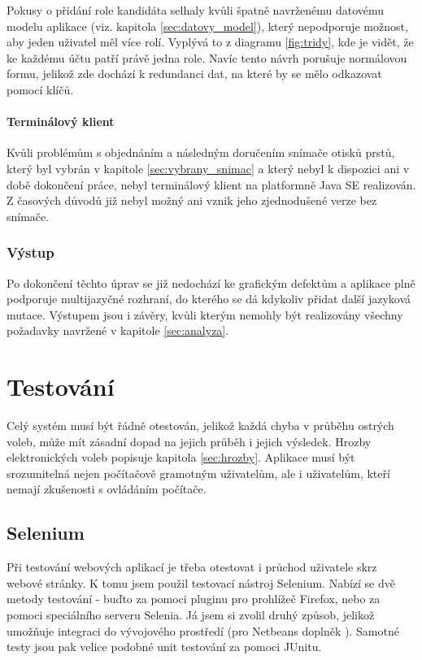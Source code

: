 \documentclass[11pt,twoside,a4paper]{book}
\begin{document}
Pokusy o přidání role kandidáta selhaly kvůli špatně navrženému datovému modelu aplikace (viz. kapitola \ref{sec:datovy_model}), který nepodporuje možnost, aby jeden uživatel měl více rolí. Vyplývá to z diagramu \ref{fig:tridy}, kde je vidět, že ke každému účtu patří právě jedna role. Navíc tento návrh porušuje normálovou formu, jelikož zde dochází k redundanci dat, na které by se mělo odkazovat pomocí klíčů.

\subsubsection{Terminálový klient}

Kvůli problémům s objednáním a následným doručením snímače otisků prstů, který byl vybrán v kapitole \ref{sec:vybrany_snimac} a který nebyl k dispozici ani v době dokončení práce, nebyl terminálový klient na platformně Java SE realizován. Z časových důvodů již nebyl možný ani vznik jeho zjednodušené verze bez snímače.

\subsection{Výstup}

Po dokončení těchto úprav se již nedochází ke grafickým defektům a aplikace plně podporuje multijazyčné rozhraní, do kterého se dá kdykoliv přidat další jazyková mutace. Výstupem jsou i závěry, kvůli kterým nemohly být realizovány všechny požadavky navržené v kapitole \ref{sec:analyza}.


\chapter{Testování}

Celý systém musí být řádně otestován, jelikož každá chyba v průběhu ostrých voleb, může mít zásadní dopad na jejich průběh i jejich výsledek. Hrozby elektronických voleb popisuje kapitola \ref{sec:hrozby}. Aplikace musí být srozumitelná nejen počítačově gramotným uživatelům, ale i uživatelům, kteří nemají zkušenosti s ovládáním počítače. 


\section{Selenium}

Při testování webových aplikací je třeba otestovat i průchod uživatele skrz webové stránky. K tomu jsem použil testovací nástroj Selenium. Nabízí se dvě metody testování - buďto za pomoci pluginu pro prohlížeč Firefox, nebo za pomoci speciálního serveru Selenia. Já jsem si zvolil druhý způsob, jelikož umožňuje integraci do vývojového prostředí (pro Netbeans doplněk ). Samotné testy jsou pak velice podobné unit testování za pomoci JUnitu. 
\end{document}

